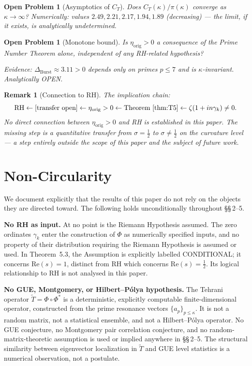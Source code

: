 \documentclass[11pt]{article}
\newtheorem*{remark}{Remark}
\newtheorem{openproblem}[theorem]{Open Problem}
\newcommand{\etaorig}{\eta_{\mathrm{orig}}}
\newcommand{\Tt}{\widetilde{T}}
\newcommand{\CT}{C_{T}}
\newcommand{\Dburstvar}{\Delta_{\mathrm{Burst}}}
\begin{document}
\begin{openproblem}[Asymptotics of $\CT$]\label{op:ct}
Does $\CT(\kappa)/\pi(\kappa)$ converge as $\kappa\to\infty$?
Numerically: values $2.49, 2.21, 2.17, 1.94, 1.89$ (decreasing) ---
the limit, if it exists, is analytically undetermined.
\end{openproblem}

\begin{openproblem}[Monotone bound]\label{op:mono}
Is $\etaorig > 0$ a consequence of the Prime Number Theorem alone,
independent of any RH-related hypothesis?

Evidence: $\Dburstvar\approx 3.11 > 0$ depends only on primes
$p\leq 7$ and is $\kappa$-invariant.
Analytically OPEN.
\end{openproblem}

\begin{remark}[Connection to RH]
The implication chain:
\[
\mathrm{RH} \leftarrow
[\text{transfer open}]
\leftarrow \etaorig > 0
\leftarrow \text{Theorem~\ref{thm:T5}}
\leftarrow \zeta(1+in\gamma_k)\neq 0.
\]
No direct connection between $\etaorig > 0$ and RH is established
in this paper. The missing step is a quantitative transfer from
$\sigma=\tfrac{1}{2}$ to $\sigma\neq\tfrac{1}{2}$ on the curvature level
--- a step entirely outside the scope of this paper and the subject of
future work.
\end{remark}

\section{Non-Circularity}
\label{sec:nocirc}

We document explicitly that the results of this paper do not rely on
the objects they are directed toward. The following holds unconditionally
throughout \S\S\,2--5.

\textbf{No RH as input.}
At no point is the Riemann Hypothesis assumed. The zero ordinates
$\gamma_k$ enter the construction of $\Phi$ as numerically specified
inputs, and no property of their distribution requiring the Riemann
Hypothesis is assumed or used. In Theorem~5.3, the Assumption is
explicitly labelled CONDITIONAL; it concerns $\mathrm{Re}(s)=1$,
distinct from RH which concerns $\mathrm{Re}(s)=\tfrac12$. Its
logical relationship to RH is not analysed in this paper.

\textbf{No GUE, Montgomery, or Hilbert--P\'olya hypothesis.}
The Tehrani operator $\Tt = \Phi\circ\Phi^*$ is a deterministic,
explicitly computable finite-dimensional operator, constructed from
the prime resonance vectors $\{a_p\}_{p\le\kappa}$. It is not a random
matrix, not a statistical ensemble, and not a Hilbert--P\'olya
operator. No GUE conjecture, no Montgomery pair correlation conjecture,
and no random-matrix-theoretic assumption is used or implied anywhere
in \S\S\,2--5. The structural similarity between eigenvector
localization in $\Tt$ and GUE level statistics is a numerical
observation, not a postulate.
\end{document}
